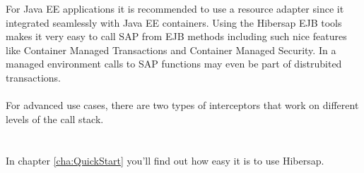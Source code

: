   For Java EE applications it is recommended to use a resource adapter since it integrated seamlessly with  
  Java EE containers. Using the Hibersap EJB tools makes it very easy to call SAP from EJB methods including
  such nice features like Container Managed Transactions and Container Managed Security. In a managed environment
  calls to SAP functions may even be part of distrubited transactions.  
  \\ \\
  For advanced use cases, there are two types of interceptors that work on different levels of the call stack.
  \\ \\ \\
  In chapter \ref{cha:QuickStart} you'll find out how easy it is to use Hibersap.
